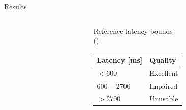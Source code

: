 \documentclass[aspectratio=1610]{beamer}
\begin{document}
\begin{frame}{Results}
\begin{columns}[onlytextwidth]
\begin{column}{.6\textwidth}
\begin{center}
{                }%
            \end{center}
        \end{column}
        \begin{column}{.4\textwidth}
            \begin{center}
                Reference latency bounds\\(\textcite{Chen:AnEmpiricalStudyOfLatency}).
            \begin{table}[]
                \centering%
                \footnotesize%
                \label{my-label}%
                \begin{tabular}{@{}ll@{}}
                    \toprule
                    Latency {[}ms{]} & Quality   \\ \midrule
                    $< 600$          & Excellent \\
                    $600-2700$       & Impaired  \\
                    $> 2700$         & Unusable  \\ \bottomrule
                \end{tabular}%
            \end{table}
            \end{center}
        \end{column}
    \end{columns}
\end{frame}
\end{document}
